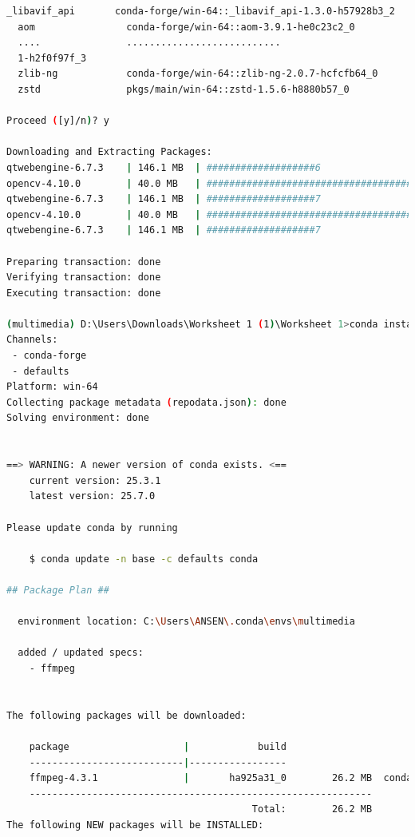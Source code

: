 \documentclass[11pt,a4paper]{article}
\begin{document}
\begin{itemize}
\begin{lstlisting}[language=bash, caption=Output instalansi library]
  _libavif_api       conda-forge/win-64::_libavif_api-1.3.0-h57928b3_2
  aom                conda-forge/win-64::aom-3.9.1-he0c23c2_0
  ....               ...........................
  1-h2f0f97f_3
  zlib-ng            conda-forge/win-64::zlib-ng-2.0.7-hcfcfb64_0
  zstd               pkgs/main/win-64::zstd-1.5.6-h8880b57_0

Proceed ([y]/n)? y

Downloading and Extracting Packages:
qtwebengine-6.7.3    | 146.1 MB  | ###################6                                                                                                                 |  15%  
opencv-4.10.0        | 40.0 MB   | ###########################################################################9                                                         |  58%  
qtwebengine-6.7.3    | 146.1 MB  | ###################7                                                                                                                 |  15%  
opencv-4.10.0        | 40.0 MB   | ############################################################################1                                                        |  58%  
qtwebengine-6.7.3    | 146.1 MB  | ###################7                                                                                                                 |  15%  

Preparing transaction: done
Verifying transaction: done
Executing transaction: done

(multimedia) D:\Users\Downloads\Worksheet 1 (1)\Worksheet 1>conda install -c conda-forge ffmpeg
Channels:
 - conda-forge
 - defaults
Platform: win-64
Collecting package metadata (repodata.json): done
Solving environment: done


==> WARNING: A newer version of conda exists. <==
    current version: 25.3.1
    latest version: 25.7.0

Please update conda by running

    $ conda update -n base -c defaults conda

## Package Plan ##

  environment location: C:\Users\ANSEN\.conda\envs\multimedia

  added / updated specs:
    - ffmpeg


The following packages will be downloaded:

    package                    |            build
    ---------------------------|-----------------
    ffmpeg-4.3.1               |       ha925a31_0        26.2 MB  conda-forge
    ------------------------------------------------------------
                                           Total:        26.2 MB
The following NEW packages will be INSTALLED:


\end{lstlisting}
\end{itemize}
\end{document}
